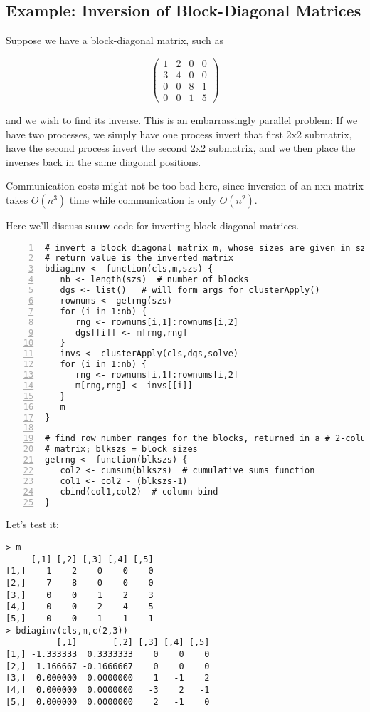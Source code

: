 \subsection{Example:  Inversion of Block-Diagonal Matrices}
\label{blkd}

Suppose we have a block-diagonal matrix, such as

$$
\left (
   \begin{array}{cccc}
   1 & 2 & 0 & 0 \\
   3 & 4 & 0 & 0 \\
   0 & 0 & 8 & 1 \\
   0 & 0 & 1 & 5 
   \end{array}
\right )     
$$

\noindent
and we wish to find its inverse.  This is an embarrassingly parallel
problem:  If we have two processes, we simply have one process invert that
first 2x2 submatrix, have the second process invert the second 2x2
submatrix, and we then place the inverses back in the same diagonal
positions.  

Communication costs might not be too bad here, since inversion of an nxn
matrix takes $O(n^3)$ time while communication is only $O(n^2)$.

Here we'll discuss {\bf snow} code for inverting block-diagonal matrices.

\begin{lstlisting}[numbers=left]
# invert a block diagonal matrix m, whose sizes are given in szs;
# return value is the inverted matrix
bdiaginv <- function(cls,m,szs) {
   nb <- length(szs)  # number of blocks
   dgs <- list()   # will form args for clusterApply()
   rownums <- getrng(szs)
   for (i in 1:nb) {
      rng <- rownums[i,1]:rownums[i,2]
      dgs[[i]] <- m[rng,rng]
   }
   invs <- clusterApply(cls,dgs,solve)
   for (i in 1:nb) {
      rng <- rownums[i,1]:rownums[i,2]
      m[rng,rng] <- invs[[i]]
   }
   m  
}

# find row number ranges for the blocks, returned in a # 2-column 
# matrix; blkszs = block sizes
getrng <- function(blkszs) {
   col2 <- cumsum(blkszs)  # cumulative sums function
   col1 <- col2 - (blkszs-1)
   cbind(col1,col2)  # column bind
}
\end{lstlisting}

Let's test it:

\begin{lstlisting}
> m
     [,1] [,2] [,3] [,4] [,5]
[1,]    1    2    0    0    0
[2,]    7    8    0    0    0
[3,]    0    0    1    2    3
[4,]    0    0    2    4    5
[5,]    0    0    1    1    1
> bdiaginv(cls,m,c(2,3))
          [,1]       [,2] [,3] [,4] [,5]
[1,] -1.333333  0.3333333    0    0    0
[2,]  1.166667 -0.1666667    0    0    0
[3,]  0.000000  0.0000000    1   -1    2
[4,]  0.000000  0.0000000   -3    2   -1
[5,]  0.000000  0.0000000    2   -1    0
\end{lstlisting}

